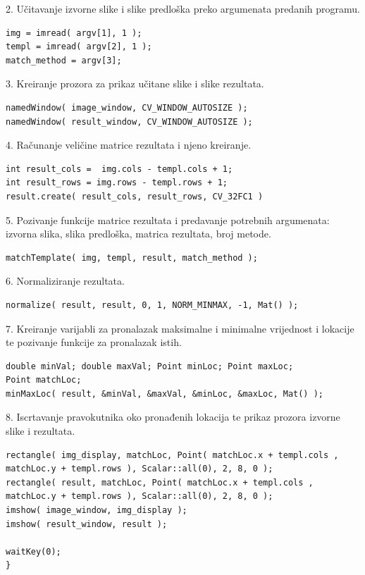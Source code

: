 2. Učitavanje izvorne slike i slike predloška preko argumenata predanih
programu.
\begin{lstlisting}[caption={}]
img = imread( argv[1], 1 );
templ = imread( argv[2], 1 );
match_method = argv[3];
\end{lstlisting}

3. Kreiranje prozora za prikaz učitane slike i slike rezultata.
\begin{lstlisting}[caption={}]
namedWindow( image_window, CV_WINDOW_AUTOSIZE );
namedWindow( result_window, CV_WINDOW_AUTOSIZE );
\end{lstlisting}

4. Računanje veličine matrice rezultata i njeno kreiranje.
\begin{lstlisting}[caption={}]
int result_cols =  img.cols - templ.cols + 1;
int result_rows = img.rows - templ.rows + 1;
result.create( result_cols, result_rows, CV_32FC1 )
\end{lstlisting}

5. Pozivanje funkcije matrice rezultata i predavanje potrebnih
argumenata: izvorna slika, slika predloška, matrica rezultata, broj
metode.
\begin{lstlisting}[caption={}]
matchTemplate( img, templ, result, match_method );
\end{lstlisting}

6. Normaliziranje rezultata.
\begin{lstlisting}[caption={}]
normalize( result, result, 0, 1, NORM_MINMAX, -1, Mat() );
\end{lstlisting}

7. Kreiranje varijabli za pronalazak maksimalne i minimalne vrijednost i
lokacije te pozivanje funkcije za pronalazak istih.
\begin{lstlisting}[caption={}]
double minVal; double maxVal; Point minLoc; Point maxLoc;
Point matchLoc;
minMaxLoc( result, &minVal, &maxVal, &minLoc, &maxLoc, Mat() );
\end{lstlisting}

8. Iscrtavanje pravokutnika oko pronađenih lokacija te prikaz prozora
izvorne slike i rezultata.
\begin{lstlisting}[caption={}]
rectangle( img_display, matchLoc, Point( matchLoc.x + templ.cols , matchLoc.y + templ.rows ), Scalar::all(0), 2, 8, 0 );
rectangle( result, matchLoc, Point( matchLoc.x + templ.cols , matchLoc.y + templ.rows ), Scalar::all(0), 2, 8, 0 );
imshow( image_window, img_display );
imshow( result_window, result );

waitKey(0);
}
\end{lstlisting}

